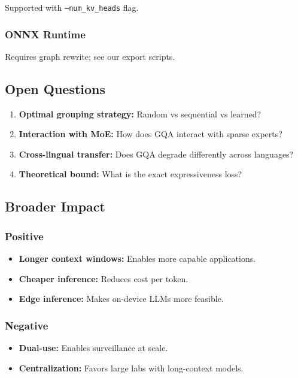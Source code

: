 Supported with \texttt{--num\_kv\_heads} flag.

\subsubsection{ONNX Runtime}

Requires graph rewrite; see our export scripts.

\subsection{Open Questions}

\begin{enumerate}
\item \textbf{Optimal grouping strategy:} Random vs sequential vs learned?
\item \textbf{Interaction with MoE:} How does GQA interact with sparse experts?
\item \textbf{Cross-lingual transfer:} Does GQA degrade differently across languages?
\item \textbf{Theoretical bound:} What is the exact expressiveness loss?

\end{enumerate}
\subsection{Broader Impact}

\subsubsection{Positive}
\begin{itemize}
\item \textbf{Longer context windows:} Enables more capable applications.
\item \textbf{Cheaper inference:} Reduces cost per token.
\item \textbf{Edge inference:} Makes on-device LLMs more feasible.

\end{itemize}
\subsubsection{Negative}
\begin{itemize}
\item \textbf{Dual-use:} Enables surveillance at scale.
\item \textbf{Centralization:} Favors large labs with long-context models.

\end{itemize}
